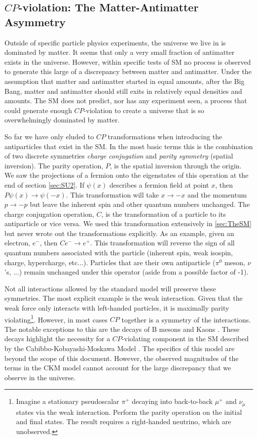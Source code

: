 \subsection{\texorpdfstring{$CP$}{CP}-violation: The Matter-Antimatter Asymmetry}
\label{sec:CPviolation}

Outside of specific particle physics experiments, the universe we live in is dominated by matter. It seems that only a very small fraction of antimatter exists in the universe. However, within specific tests of SM no process is observed to generate this large of a discrepancy between matter and antimatter. Under the assumption that matter and antimatter started in equal amounts, after the Big Bang, matter and antimatter should still exits in relatively equal densities and amounts. The SM does not predict, nor has any experiment seen, a process that could generate enough $CP$-violation to create a universe that is so overwhelmingly dominated by matter.

So far we have only eluded to $CP$ transformations when introducing the antiparticles that exist in the SM. In the most basic terms this is the combination of two discrete symmetries \textit{charge conjugation} and \textit{parity symmetry} (spatial inversion). The parity operation, $P$, is the spatial inversion through the origin. We saw the projections of a fermion onto the eigenstates of this operation at the end of section \ref{sec:SU2}. If $\psi\left(x\right)$ describes a fermion field at point $x$, then $P\psi\left(x\right) \to \psi\left(-x\right)$. This transformation will take $x \to -x$ and the momentum $p \to -p$ but leave the inherent spin and other quantum numbers unchanged. The charge conjugation operation, $C$, is the transformation of a particle to its antiparticle or vice versa. We used this transformation extensively in \ref{sec:TheSM} but never wrote out the transformations explicitly. As an example, given an electron, $e^{-}$, then $Ce^{-} \to e^{+}$. This transformation will reverse the sign of all quantum numbers associated with the particle (inherent spin, weak isospin, charge, hypercharge, etc...). Particles that are their own antiparticle ($\pi^0$ meson, $\nu$'s, ...) remain unchanged under this operator (aside from a possible factor of -1).

Not all interactions allowed by the standard model will preserve these symmetries. The most explicit example is the weak interaction. Given that the weak force only interacts with left-handed particles, it is maximally parity violating\footnote{Imagine a stationary pseudoscalar $\pi^{+}$ decaying into back-to-back $\mu^{+}$ and $\nu_{\mu}$ states via the weak interaction. Perform the parity operation on the initial and final states. The result requires a right-handed neutrino, which are unobserved.}. However, in most cases $CP$ together is a symmetry of the interactions. The notable exceptions to this are the decays of B mesons and Kaons \cite{Agashe:2014kda}. These decays highlight the necessity for a $CP$-violating component in the SM described by the Cabibbo-Kobayashi-Moskawa Model \cite{Kobayashi:1973fv}. The specifics of this model are beyond the scope of this document. However, the observed magnitudes of the terms in the CKM model cannot account for the large discrepancy that we observe in the universe.

